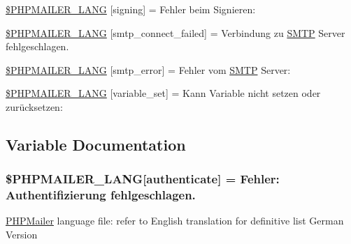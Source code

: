 \begin{DoxyCompactItemize}
\item 
\hyperlink{phpmailer_8lang-de_8php_a68e437bdb9b968a5a67320f03d231565}{\$\+P\+H\+P\+M\+A\+I\+L\+E\+R\+\_\+\+L\+A\+NG} \mbox{[}\textquotesingle{}signing\textquotesingle{}\mbox{]} = \textquotesingle{}Fehler beim Signieren\+: \textquotesingle{}
\item 
\hyperlink{phpmailer_8lang-de_8php_a7b321d4ca1e9df702403ed4c61aa0980}{\$\+P\+H\+P\+M\+A\+I\+L\+E\+R\+\_\+\+L\+A\+NG} \mbox{[}\textquotesingle{}smtp\+\_\+connect\+\_\+failed\textquotesingle{}\mbox{]} = \textquotesingle{}Verbindung zu \hyperlink{class_s_m_t_p}{S\+M\+TP} Server fehlgeschlagen.\textquotesingle{}
\item 
\hyperlink{phpmailer_8lang-de_8php_a7d9cffba1e669c845f8a4c891ee50064}{\$\+P\+H\+P\+M\+A\+I\+L\+E\+R\+\_\+\+L\+A\+NG} \mbox{[}\textquotesingle{}smtp\+\_\+error\textquotesingle{}\mbox{]} = \textquotesingle{}Fehler vom \hyperlink{class_s_m_t_p}{S\+M\+TP} Server\+: \textquotesingle{}
\item 
\hyperlink{phpmailer_8lang-de_8php_af795debc7a739d038742691c358d9032}{\$\+P\+H\+P\+M\+A\+I\+L\+E\+R\+\_\+\+L\+A\+NG} \mbox{[}\textquotesingle{}variable\+\_\+set\textquotesingle{}\mbox{]} = \textquotesingle{}Kann Variable nicht setzen oder zurücksetzen\+: \textquotesingle{}
\end{DoxyCompactItemize}


\subsection{Variable Documentation}
\subsubsection[{\texorpdfstring{\$\+P\+H\+P\+M\+A\+I\+L\+E\+R\+\_\+\+L\+A\+NG}{$PHPMAILER_LANG}}]{\setlength{\rightskip}{0pt plus 5cm}\$P\+H\+P\+M\+A\+I\+L\+E\+R\+\_\+\+L\+A\+NG\mbox{[}\textquotesingle{}authenticate\textquotesingle{}\mbox{]} =  Fehler\+: Authentifizierung fehlgeschlagen.\textquotesingle{}}\hypertarget{phpmailer_8lang-de_8php_a2cb33073c989b85580748e331ed8b4aa}{}\label{phpmailer_8lang-de_8php_a2cb33073c989b85580748e331ed8b4aa}
\hyperlink{class_p_h_p_mailer}{P\+H\+P\+Mailer} language file\+: refer to English translation for definitive list German Version 

